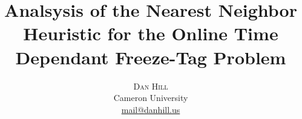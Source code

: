 \newcommand{\articletitle}{Analsysis of the Nearest Neighbor\\ Heuristic for the Online Time\\ \vspace{1.4mm} Dependant Freeze-Tag Problem}
\newcommand{\name}{Dan Hill}
\newcommand{\university}{Cameron University}
\newcommand{\email}{mail@danhill.us}


\title{\vspace{-15mm}\fontsize{24pt}{10pt}\selectfont\textbf{\articletitle}} %

\author{\large\textsc{\name} \\[2mm] 		%
\normalsize \university \\		 			%
\normalsize \href{mailto:\email}{\email} 	%
\vspace{-5mm}}

\date{}
